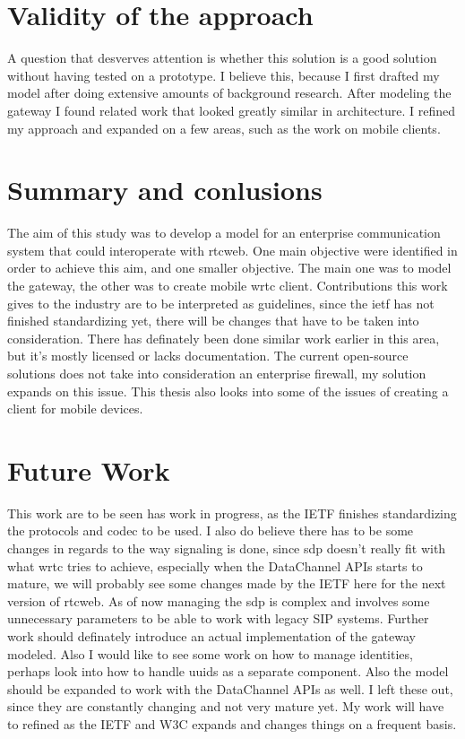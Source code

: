 \section{Validity of the approach}
A question that desverves attention is whether this solution is a good solution without having tested on a prototype. I believe this, because I first drafted my model after doing extensive amounts of background research. After modeling the gateway I found related work that looked greatly similar in architecture. I refined my approach and expanded on a few areas, such as the work on mobile clients.

\section{Summary and conlusions}
The aim of this study was to develop a model for an enterprise communication system that could interoperate with \gls{rtcweb}. One main objective were identified in order to achieve this aim, and one smaller objective. The main one was to model the gateway, the other was to create mobile \gls{wrtc} client. Contributions this work gives to the industry are to be interpreted as guidelines, since the \gls{ietf} has not finished standardizing yet, there will be changes that have to be taken into consideration. There has definately been done similar work earlier in this area, but it's mostly licensed or lacks documentation. The current open-source solutions does not take into consideration an enterprise firewall, my solution expands on this issue. This thesis also looks into some of the issues of creating a client for mobile devices.

\section{Future Work}
This work are to be seen has work in progress, as the IETF finishes standardizing the protocols and codec to be used. I also do believe there has to be some changes in regards to the way signaling is done, since \gls{sdp} doesn't really fit with what \gls{wrtc} tries to achieve, especially when the DataChannel APIs starts to mature, we will probably see some changes made by the IETF here for the next version of \gls{rtcweb}. As of now managing the \gls{sdp} is complex and involves some unnecessary parameters to be able to work with legacy SIP systems. Further work should definately introduce an actual implementation of the gateway modeled. Also I would like to see some work on how to manage identities, perhaps look into how to handle \gls{uuid}s as a separate component. Also the model should be expanded to work with the DataChannel APIs as well. I left these out, since they are constantly changing and not very mature yet. My work will have to refined as the IETF and W3C expands and changes things on a frequent basis.

